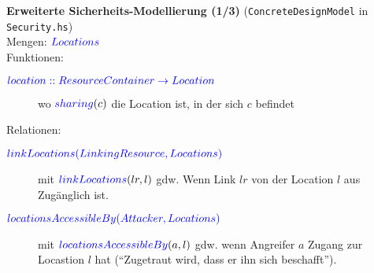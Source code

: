\documentclass[varwidth=13cm]{standalone}
\begin{document}
\textbf{Erweiterte Sicherheits-Modellierung (1/3)} (\texttt{ConcreteDesignModel} in \texttt{Security.hs})\\

Mengen: ${\color{blue}{Locations}}$  \\


Funktionen:
\begin{description}
  \item[${\color{blue}{location :: ResourceContainer \rightarrow Location}}$]
        wo ${\color{blue}{sharing}}(c)$ die Location ist, in der sich $c$ befindet
\end{description}


Relationen:
\begin{description}
  \item[${\color{blue}{linkLocations(LinkingResource, Locations)}}$]
        mit ${\color{blue}{linkLocations}}(lr, l)$ gdw. Wenn Link $lr$
        von der Location $l$ aus Zugänglich ist.

  \item[${\color{blue}{locationsAccessibleBy(Attacker, Locations)}}$]
        mit ${\color{blue}{locationsAccessibleBy}}(a, l)$ gdw. wenn Angreifer $a$
        Zugang zur Locastion $l$ hat (\enquote{Zugetraut wird, dass er ihn sich beschafft}).
\end{description}
\end{document}
